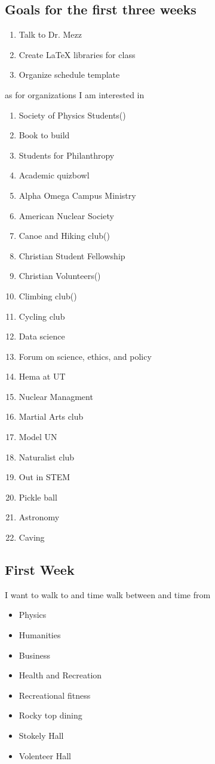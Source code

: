 \subsection{Goals for the first three weeks}
\begin{enumerate}
\item Talk to Dr. Mezz
\item Create LaTeX libraries for class
  \item Organize schedule template
\end{enumerate}
as for organizations I am interested in
\begin{enumerate}
\item Society of Physics Students()
\item Book to build
\item Students for Philanthropy
\item Academic quizbowl
\item Alpha Omega Campus Ministry
\item American Nuclear Society
\item Canoe and Hiking club()
\item Christian Student Fellowship
\item Christian Volunteers()
\item Climbing club()
\item Cycling club
\item Data science
\item Forum on science, ethics, and policy
\item Hema at UT
\item Nuclear Managment
\item Martial Arts club
\item Model UN
\item Naturalist club
\item Out in STEM
\item Pickle ball
\item Astronomy
\item Caving
\end{enumerate}

\subsection{First Week}
I want to walk to and time walk between and time from
\begin{itemize}
  \item Physics
  \item Humanities
  \item Business
  \item Health and Recreation
  \item Recreational fitness
  \item Rocky top dining
  \item Stokely Hall
  \item Volenteer Hall
\end{itemize}

